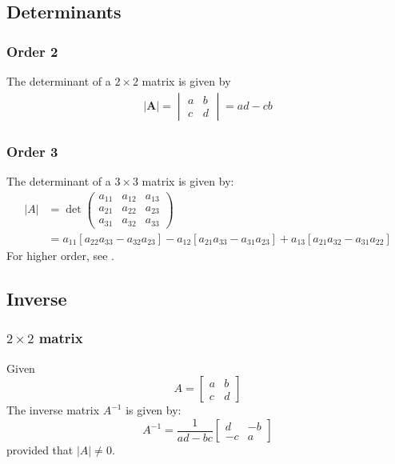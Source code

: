 \documentclass[11pt,a4paper]{book}
\theoremstyle{definition}\newtheorem{definition}{Definition}
\theoremstyle{definition}\newtheorem{fact}{Fact}
\theoremstyle{definition}\newtheorem{remark}{Remark}
\theoremstyle{definition}\newtheorem{ex}{Ex.}
\theoremstyle{definition}\newtheorem{project}{Project}
\theoremstyle{definition}\newtheorem{problem}{Problem}
\theoremstyle{definition}\newtheorem{example}{Example}
\numberwithin{theorem}{section}
\numberwithin{corollary}{chapter}
\numberwithin{assumption}{chapter}
\numberwithin{definition}{chapter}
\numberwithin{prop}{chapter}
\numberwithin{notation}{chapter}
\numberwithin{problem}{chapter}
\numberwithin{example}{chapter}
\numberwithin{fact}{chapter}
\numberwithin{ex}{chapter}
\def\A{\mathbf A}
\begin{document}
\begin{appendices}
	\subsection*{Determinants}
	\subsubsection*{Order 2}
	The determinant of a $2\times 2$ matrix is given by
	\begin{align*}
		|\A| = \begin{vmatrix}
			a & b \\ c & d
		\end{vmatrix} = ad - cb
	\end{align*}
	
	\subsubsection*{Order 3}
	The determinant of a $3\times 3$ matrix is given by:
	\begin{align*}
		|A| &= \det \begin{pmatrix}
			a_{11} & a_{12} & a_{13} \\
			a_{21} & a_{22} & a_{23} \\
			a_{31} & a_{32} & a_{33} 
		\end{pmatrix} \\
		&= a_{11} [a_{22}a_{33} - a_{32}a_{23}] 
		- a_{12}[a_{21}a_{33} - a_{31}a_{23}] 
		+ a_{13}[a_{21}a_{32} - a_{31}a_{22}]
	\end{align*}
	For higher order, see \citet[Ch. 9.4.2]{springcamp}. 
	
	\subsection*{Inverse}
	\subsubsection{$2\times 2$ matrix}
	Given
	\[
	A = \begin{bmatrix}
		a & b \\
		c & d
	\end{bmatrix}
	\]
	The inverse matrix \(A^{-1}\) is given by:
	\[
	A^{-1} = \frac{1}{ad - bc} \begin{bmatrix}
		d & -b \\
		-c & a
	\end{bmatrix}
	\]
	provided that $|A| \neq 0$.

\end{appendices}
\end{document}

